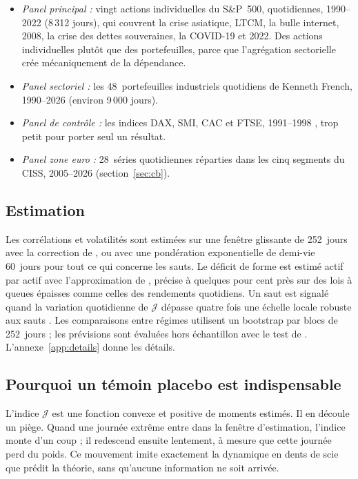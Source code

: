 \documentclass[11pt]{article}
\theoremstyle{definition}
\newcommand{\JJ}{\mathcal{J}}
\begin{document}
\begin{itemize}
\item \emph{Panel principal :} vingt actions individuelles du S\&P~500,
quotidiennes, 1990--2022 (8\,312 jours), qui couvrent la crise asiatique, LTCM,
la bulle internet, 2008, la crise des dettes souveraines, la COVID-19 et 2022.
Des actions individuelles plutôt que des portefeuilles, parce que l'agrégation
sectorielle crée mécaniquement de la dépendance.
\item \emph{Panel sectoriel :} les 48~portefeuilles industriels quotidiens de
Kenneth French, 1990--2026 (environ 9\,000 jours).
\item \emph{Panel de contrôle :} les indices DAX, SMI, CAC et FTSE, 1991--1998
\citep{bollerslev1996}, trop petit pour porter seul un résultat.
\item \emph{Panel zone euro :} 28~séries quotidiennes réparties dans les cinq
segments du CISS, 2005--2026 (section~\ref{sec:cb}).
\end{itemize}

\subsection{Estimation}

Les corrélations et volatilités sont estimées sur une fenêtre glissante de
252~jours avec la correction de \citet{ledoit2004}, ou avec une pondération
exponentielle de demi-vie 60~jours pour tout ce qui concerne les sauts. Le
déficit de forme est estimé actif par actif avec l'approximation de
\citet{hyvarinen1998}, précise à quelques pour cent près sur des lois à queues
épaisses comme celles des rendements quotidiens. Un saut est signalé quand la
variation quotidienne de $\JJ$ dépasse quatre fois une échelle locale robuste
aux sauts \citep{bns2004}. Les comparaisons entre régimes utilisent un
bootstrap par blocs de 252~jours ; les prévisions sont évaluées hors
échantillon avec le test de \citet{dm1995}. L'annexe~\ref{app:details}
donne les détails.

\subsection{Pourquoi un témoin placebo est indispensable}
\label{sec:placebo}

L'indice $\JJ$ est une fonction convexe et positive de moments estimés. Il en
découle un piège. Quand une journée extrême entre dans la fenêtre
d'estimation, l'indice monte d'un coup ; il redescend ensuite lentement, à
mesure que cette journée perd du poids. Ce mouvement imite exactement la
dynamique en dents de scie que prédit la théorie, sans qu'aucune information
ne soit arrivée.
\end{document}
